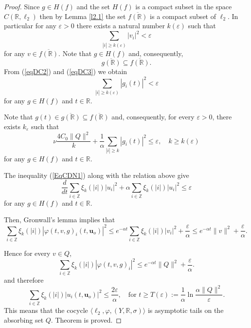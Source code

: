 \documentclass{amsart}%
\begin{document}
\begin{proof}
Since $g\in H(f)$ and the set $H(f)$ is a compact subset in the
space $C(\mathbb R,\ell_{2})$ then by Lemma \ref{l2.1} the set
$\overline{f(\mathbb R)}$ is a compact subset of $\ell_{2}$. In
particular for any $\varepsilon >0$ there exists a natural number
$k(\varepsilon)$ such that
\begin{equation}\label{eqDC2}
\sum\limits_{|i|\ge k(\varepsilon)}|v_i|^{2}<\varepsilon
\end{equation}
for any $v\in \overline{f(\mathbb R)}$. Note that $g\in H(f)$ and,
consequently,
\begin{equation}\label{eqDC3}
\overline{g(\mathbb R)}\subseteq \overline{f(\mathbb R)}.
\end{equation}
From (\ref{eqDC2}) and (\ref{eqDC3}) we obtain
\begin{equation}\label{eqDC4}
\sum\limits_{|i|\ge k(\varepsilon)}|g_i(t)|^{2}<\varepsilon
\nonumber
\end{equation}
for any $g\in H(f)$ and $t\in \mathbb R$.

Note that $g(t)\in \overline{g(\mathbb R)}\subseteq
\overline{f(\mathbb R)}$ and, consequently, for every \(
\varepsilon
> 0 \), there exists $k_{\varepsilon}$ such that
\[
\nu \frac{4C_0 \|Q\|^2}{k} + \frac{1}{\alpha} \sum_{|i| \ge k}
|g_{i}(t)|^2 \le \varepsilon, \quad k \ge k(\varepsilon)
\]
for any $g\in H(f)$ and $t\in \mathbb R$.

The inequality (\ref{EqCDN1}) along with the relation above give
\[
\frac{d}{dt} \sum_{i \in \mathbb{Z}} \xi_k(|i|) |u_i|^2 + \alpha
\sum_{i \in \mathbb{Z}} \xi_k(|i|) |u_i|^2 \le \varepsilon
\]
for any $g\in H(f)$ and $t\in \mathbb R$.

Then, Gronwall's lemma implies that
\[
\sum_{i \in \mathbb{Z}} \xi_k(|i|) |\varphi(t,v,g)_i(t,
\mathbf{u}_o)|^2 \le e^{-\alpha t} \sum_{i \in \mathbb{Z}}
\xi_k(|i|) |v_{i}|^2 + \frac{\varepsilon}{\alpha} \le e^{-\alpha
t} \|v\|^2 + \frac{\varepsilon}{\alpha}.
\]

Hence for every \( v \in Q \),
\[
\sum_{i \in \mathbb{Z}} \xi_k(|i|) |\varphi(t,v,g)_{i}|^2 \le
e^{-\alpha t} \| Q \|^2 + \frac{\varepsilon}{\alpha}.
\]
and therefore
\[
\sum_{i \in \mathbb{Z}} \xi_k(|i|) \left| u_i(t, \mathbf{u}_o) \right|^2 \le \frac{2\varepsilon}{\alpha}, \quad \text{for } t \ge T(\varepsilon) := \frac{1}{\alpha} \ln \frac{\alpha \| Q \|^2}{\varepsilon}.
\]
This means that the cocycle $\langle \ell_{2},\varphi,(Y,\mathbb
R,\sigma)\rangle$ is asymptotic tails on the absorbing set $Q$.
Theorem is proved.
\end{proof}
\end{document}
